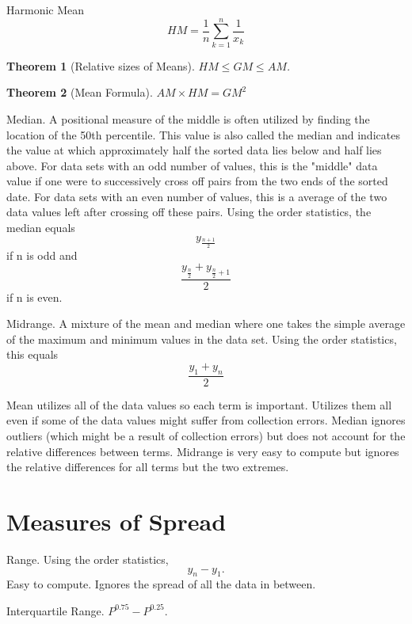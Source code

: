 \documentclass[10pt,]{book}
\theoremstyle{plain}
\newtheorem{theorem}{Theorem}[section]
\theoremstyle{definition}
\theoremstyle{definition}
\numberwithin{equation}{section}
\begin{document}
Harmonic Mean
\begin{equation*}HM = \frac{1}{n} \sum_{k=1}^n \frac{1}{x_k}\end{equation*}
%
\begin{theorem}[Relative sizes of Means]\label{theorem-5}
\(HM \le GM \le AM\). \end{theorem}
\begin{theorem}[Mean Formula]\label{theorem-6}
\(AM×HM=GM^2\)\end{theorem}
\par
Median. A positional measure of the middle is often utilized by finding the location of the 50th percentile. This value is also called the median and indicates the value at which approximately half the sorted data lies below and half lies above. For data sets with an odd number of values, this is the "middle" data value if one were to successively cross off pairs from the two ends of the sorted date. For data sets with an even number of values, this is a average of the two data values left after crossing off these pairs.  Using the order statistics, the median equals
\begin{equation*}y_{\frac{n+1}{2}}\end{equation*}
if n is odd and
\begin{equation*}\frac{y_\frac{n}{2} + y_{\frac{n}{2}+1}}{2}\end{equation*}
if n is even.
%
\par
Midrange. A mixture of the mean and median where one takes the simple average of the maximum and minimum values in the data set. Using the order statistics, this equals 
\begin{equation*}\frac{y_1+y_n}{2}\end{equation*}
%
\par


Mean utilizes all of the data values so each term is important. Utilizes them all even if some of the data values might suffer from collection errors.  Median ignores outliers (which might be a result of collection errors) but does not account for the relative differences between terms. Midrange is very easy to compute but ignores the relative differences for all terms but the two extremes.
%
\typeout{************************************************}
\typeout{************************************************}
\section[Measures of Spread]{Measures of Spread}\label{section-8}
Range. Using the order statistics, \begin{equation*}y_n - y_1.\end{equation*}  
Easy to compute. Ignores the spread of all the data in between.
%
\par
Interquartile Range. \(P^{0.75} - P^{0.25}\). 
%
\par
\end{document}
